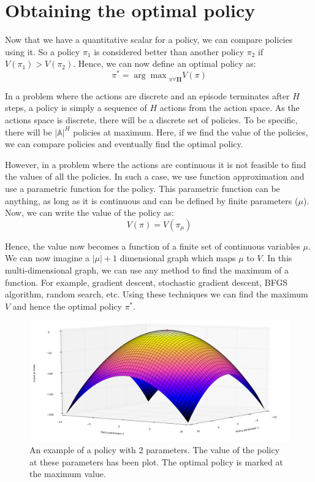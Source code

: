 \documentclass[hidelinks,BTech]{iitmdiss}
\begin{document}
\section{Obtaining the optimal policy}

Now that we have a quantitative scalar for a policy, we can compare policies using it. So a policy $\pi_{1}$ is considered better than another policy $\pi_{2}$ if $V(\pi_{1}) > V(\pi_{2})$. Hence, we can now define an optimal policy as:
\begin{equation}
  \pi^{*} = {\arg \max}_{\pi \forall \mathbf{\Pi}} {V(\pi)}
\end{equation}

In a problem where the actions are discrete and an episode terminates after $H$ steps, a policy is simply a sequence of $H$ actions from the action space. As the actions space is discrete, there will be a discrete set of policies. To be specific, there will be $|\mathbb{A}|^{H}$ policies at maximum. Here, if we find the value of the policies, we can compare policies and eventually find the optimal policy.

However, in a problem where the actions are continuous it is not feasible to find the values of all the policies. In such a case, we use function approximation and use a parametric function for the policy. This parametric function can be anything, as long as it is continuous and can be defined by finite parameters ($\mu$). Now, we can write the value of the policy as:
\begin{equation}
  V(\pi) = V(\pi_{\mu})
\end{equation}

Hence, the value now becomes a function of a finite set of continuous variables $\mu$. We can now imagine a $|\mu|+1$ dimensional graph which maps $\mu$ to $V$. In this multi-dimensional graph, we can use any method to find the maximum of a function. For example, gradient descent, stochastic gradient descent, BFGS algorithm, random search, etc. Using these techniques we can find the maximum $V$ and hence the optimal policy $\pi^{*}$.

\begin{figure}[H]
  \centering
    \includegraphics[width=\textwidth]{gradient_descent.png}
    \caption{An example of a policy with 2 parameters. The value of the policy at these parameters has been plot. The optimal policy is marked at the maximum value.}
\end{figure}
\end{document}
